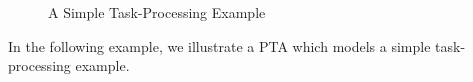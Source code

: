 
\begin{figure}
    \centering
    \resizebox{.5\textwidth}{!}{
        
        }
    \caption{A Simple Task-Processing Example}
    \label{fig:pta}
\end{figure}

In the following example, we illustrate a PTA which models a simple task-processing example.

